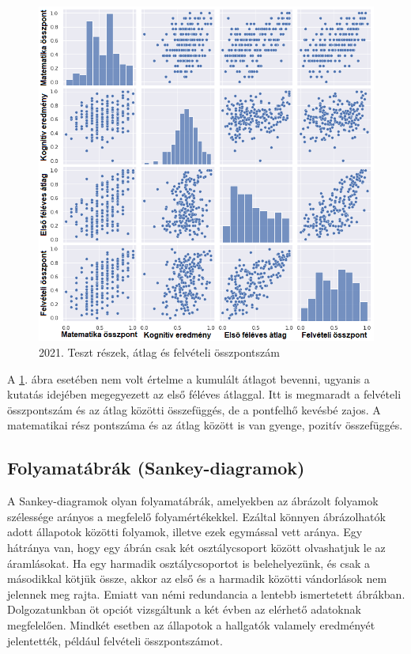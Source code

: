 \documentclass[12pt]{article}
\begin{document}
\begin{figure}[H]
\centering
\includegraphics[width=\textwidth]{kepek/2021minmax.png}
\caption{2021. Teszt részek, átlag és felvételi összpontszám}
\label{fig:2021minmax}
\end{figure}

A \ref{fig:2021minmax}. ábra esetében nem volt értelme a kumulált átlagot bevenni, ugyanis a kutatás idejében megegyezett az első féléves átlaggal. Itt is megmaradt a felvételi összpontszám és az átlag közötti összefüggés, de a pontfelhő kevésbé zajos. A matematikai rész pontszáma és az átlag között is van gyenge, pozitív összefüggés.



\subsection{Folyamatábrák (Sankey-diagramok)}
A Sankey-diagramok olyan folyamatábrák, amelyekben az ábrázolt folyamok szélessége arányos a megfelelő folyamértékekkel. Ezáltal könnyen ábrázolhatók adott állapotok közötti folyamok, illetve ezek egymással vett aránya. Egy hátránya van, hogy egy ábrán csak két osztálycsoport között olvashatjuk le az áramlásokat. Ha egy harmadik osztálycsoportot is belehelyezünk, és csak a másodikkal kötjük össze, akkor az első és a harmadik közötti vándorlások nem jelennek meg rajta. Emiatt van némi redundancia a lentebb ismertetett ábrákban.\\
Dolgozatunkban öt opciót vizsgáltunk a két évben az elérhető adatoknak megfelelően. Mindkét esetben az állapotok a hallgatók valamely eredményét jelentették, például felvételi összpontszámot.
\end{document}

